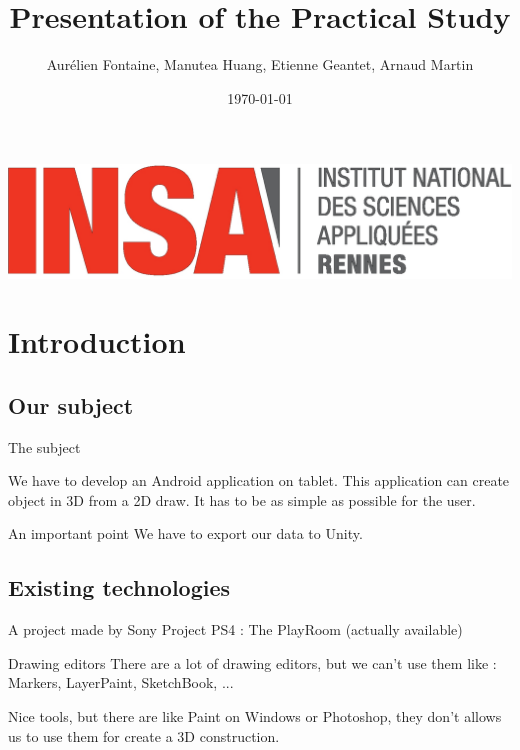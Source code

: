 \documentclass[a4paper,10pt]{beamer}
\title{Presentation of the Practical Study}
\author[Groupe 3INFO]{Aurélien Fontaine, Manutea Huang, Etienne Geantet, Arnaud Martin}
\institute[INSA de Rennes]{Institut National des Sciences Appliquées de Rennes}
\date{\today}
\begin{document}
	\begin{frame}
		\begin{titlepage}
			\centerline{\includegraphics[scale=0.1]{images/logoINSA.jpg}}
		\end{titlepage}
	\end{frame}
	
	\begin{frame}
		\tableofcontents
	\end{frame}
	
	\section{Introduction}
	
		\subsection{Our subject}
	
			\begin{frame}{The subject}
				
				We have to develop an Android application on tablet. This application can create object in 3D from a 2D draw. It has to be as simple as possible for the user.
				
				\begin{block}{An important point}
					We have to export our data to Unity.
				\end{block}
			\end{frame}
			
		\subsection{Existing technologies}
			
			\begin{frame}{A project made by Sony}
				Project PS4 : The PlayRoom (actually available)
			\end{frame}
			
			\begin{frame}{Drawing editors}
				There are a lot of drawing editors, but we can't use them like : Markers, LayerPaint, SketchBook, ...
				
				Nice tools, but there are like Paint on Windows or Photoshop, they don't allows us to use them for create a 3D construction.
			\end{frame}
	
\end{document}

